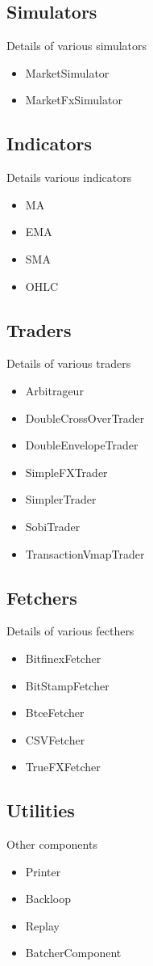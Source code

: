 \subsection{Simulators}

Details of various simulators

\begin{itemize}
\item MarketSimulator
\item MarketFxSimulator
\end{itemize}

\subsection{Indicators}

Details various indicators

\begin{itemize}
\item MA
\item EMA
\item SMA
\item OHLC
\end{itemize}

\subsection{Traders}

Details of various traders

\begin{itemize}
\item Arbitrageur
\item DoubleCrossOverTrader
\item DoubleEnvelopeTrader
\item SimpleFXTrader
\item SimplerTrader
\item SobiTrader
\item TransactionVmapTrader
\end{itemize}

\subsection{Fetchers}

Details of various fecthers

\begin{itemize}
\item BitfinexFetcher
\item BitStampFetcher
\item BtceFetcher
\item CSVFetcher
\item TrueFXFetcher
\end{itemize}

\subsection{Utilities}

Other components

\begin{itemize}
\item Printer
\item Backloop
\item Replay
\item BatcherComponent
\end{itemize}

